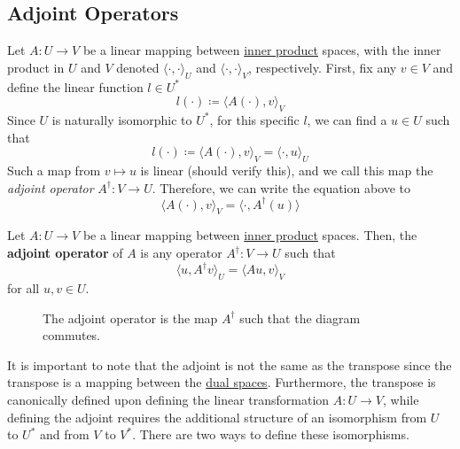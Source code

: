 \subsection{Adjoint Operators}

	Let $A: U \to V$ be a linear mapping between \hyperref[def:inner-product]{inner product} spaces, with the inner product in $U$ and $V$ denoted $\langle \cdot,\cdot \rangle_U$ and $\langle \cdot,\cdot \rangle_V$, respectively. First, fix any $v \in V$ and define the linear function $l \in U^\ast$
	\begin{equation}
		l(\cdot) \coloneqq \langle A(\cdot), v \rangle_V
	\end{equation}
	Since $U$ is naturally isomorphic to $U^\ast$, for this specific $l$, we can find a $u \in U$ such that
	\begin{equation}
		l(\cdot) \coloneqq \langle A(\cdot), v \rangle_V = \langle \cdot, u \rangle_U
	\end{equation} 
	Such a map from $v \mapsto u$ is linear (should verify this), and we call this map the \textit{adjoint operator} $A^\dagger: V \to U$. Therefore, we can write the equation above to 
	\begin{equation}
	  \langle A(\cdot), v \rangle_V = \langle \cdot, A^\dagger (u) \rangle
	\end{equation}

  \begin{definition}
    \label{def:adjoint-operator}
		Let $A: U \to V$ be a linear mapping between \hyperref[def:inner-product]{inner product} spaces. Then, the \textbf{adjoint operator} of $A$ is any operator $A^\dagger: V \to U$ such that
		\begin{equation}
		  \langle u, A^\dagger v \rangle_U = \langle A u, v \rangle_V
		\end{equation}
		for all $u, v \in U$. 

		\begin{figure}[H]
			\centering 
			\caption{The adjoint operator is the map $A^\dagger$ such that the diagram commutes.} 
			\label{fig:adjoint}
		\end{figure}
  \end{definition}

  It is important to note that the adjoint is not the same as the transpose since the transpose is a mapping between the \hyperref[def:dual-space]{dual spaces}. Furthermore, the transpose is canonically defined upon defining the linear transformation $A: U \to V$, while defining the adjoint requires the additional structure of an isomorphism from $U$ to $U^\ast$ and from $V$ to $V^\ast$. There are two ways to define these isomorphisms. 

